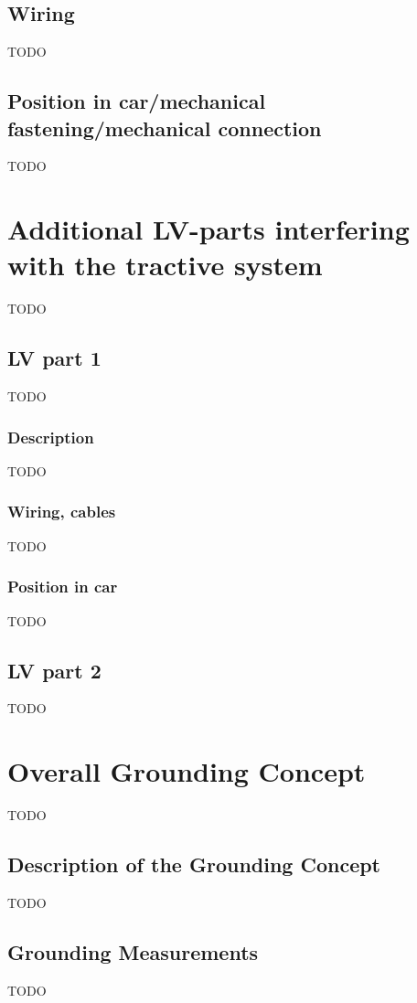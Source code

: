 \documentclass{article}
\begin{document}
\subsection{Wiring}
TODO

\subsection{Position in car/mechanical fastening/mechanical connection}
TODO

\section{Additional LV-parts interfering with the tractive system}
TODO

\subsection{LV part 1}
TODO

\subsubsection{Description}
TODO

\subsubsection*{Wiring, cables}
TODO

\subsubsection{Position in car}
TODO

\subsection{LV part 2}
TODO

\section{Overall Grounding Concept}
TODO

\subsection{Description of the Grounding Concept}
TODO

\subsection{Grounding Measurements}
TODO
\end{document}
